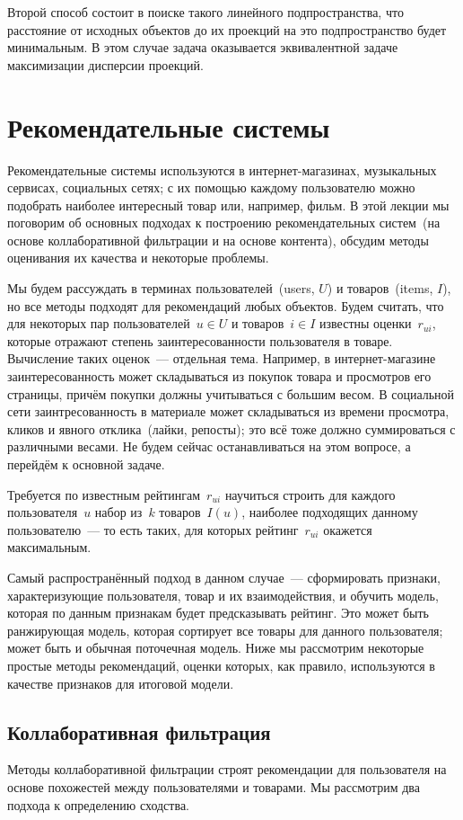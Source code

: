 \documentclass[12pt,fleqn]{article}
\begin{document}
	Второй способ состоит в поиске такого линейного подпространства,
	что расстояние от исходных объектов до их проекций на это подпространство
	будет минимальным.
	В этом случае задача оказывается эквивалентной задаче максимизации дисперсии проекций.
	
	\section{Рекомендательные системы}
	Рекомендательные системы используются в интернет-магазинах, музыкальных сервисах,
	социальных сетях; с их помощью каждому пользователю можно подобрать наиболее интересный
	товар или, например, фильм.
	В этой лекции мы поговорим об основных подходах к построению рекомендательных систем~(на основе
	коллаборативной фильтрации и на основе контента), обсудим методы оценивания их качества
	и некоторые проблемы.
	
	Мы будем рассуждать в терминах пользователей~(users, $U$) и товаров~(items, $I$),
	но все методы подходят для рекомендаций любых объектов.
	Будем считать, что для некоторых пар пользователей~$u \in U$ и товаров~$i \in I$ известны
	оценки~$r_{ui}$, которые отражают степень заинтересованности пользователя в товаре.
	Вычисление таких оценок~--- отдельная тема.
	Например, в интернет-магазине заинтересованность может складываться из покупок товара
	и просмотров его страницы, причём покупки должны учитываться с большим весом.
	В социальной сети заинтресованность в материале может складываться из времени просмотра,
	кликов и явного отклика~(лайки, репосты); это всё тоже должно суммироваться с различными весами.
	Не будем сейчас останавливаться на этом вопросе, а перейдём к основной задаче.
	
	Требуется по известным рейтингам~$r_{ui}$ научиться строить для каждого пользователя~$u$
	набор из~$k$ товаров~$I(u)$, наиболее подходящих данному пользователю~--- то есть таких,
	для которых рейтинг~$r_{ui}$ окажется максимальным.
	
	Самый распространённый подход в данном случае~--- сформировать признаки, характеризующие пользователя, товар и их взаимодействия,
	и обучить модель, которая по данным признакам будет предсказывать рейтинг.
	Это может быть ранжирующая модель, которая сортирует все товары для данного пользователя; может быть и обычная поточечная модель.
	Ниже мы рассмотрим некоторые простые методы рекомендаций, оценки которых, как правило, используются в качестве
	признаков для итоговой модели.
	
	\subsection{Коллаборативная фильтрация}
	Методы коллаборативной фильтрации строят рекомендации для пользователя на основе
	похожестей между пользователями и товарами.
	Мы рассмотрим два подхода к определению сходства.
	
\end{document}
